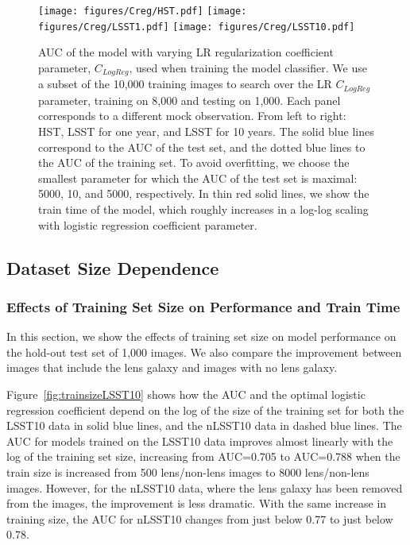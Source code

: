\documentclass{emulateapj}
\begin{document}
\begin{figure*}[t]
\begin{center}
\texttt{[image: figures/Creg/HST.pdf]}
\texttt{[image: figures/Creg/LSST1.pdf]}
\texttt{[image: figures/Creg/LSST10.pdf]}
\caption{AUC of the model with varying LR regularization coefficient
  parameter, $C_{LogReg}$, used when training the model classifier.  We
  use a subset of the 10,000 training images to search over the LR
  $C_{LogReg}$ parameter, training on 8,000 and testing on 1,000.  Each
  panel corresponds to a different mock observation.  From left to
  right: HST, LSST for one year, and LSST for 10 years.  The solid
  blue lines correspond to the AUC of the test set, and the dotted
  blue lines to the AUC of the training set.  To avoid overfitting, we
  choose the smallest parameter for which the AUC of the test set is
  maximal: 5000, 10, and 5000, respectively.  In thin red solid lines,
  we show the train time of the model, which roughly increases in a
  log-log scaling with logistic regression coefficient
  parameter.}\label{fig:regularization}
\end{center}
\end{figure*}

\subsection{Dataset Size Dependence}\label{sec:datasize}
\subsubsection{Effects of Training Set Size on Performance and Train Time}\label{sec:trainsetsize}

In this section, we show the effects of training set size on model
performance on the hold-out test set of 1,000 images.  We also compare
the improvement between images that include the lens galaxy and images
with no lens galaxy.

Figure~\ref{fig:trainsizeLSST10} shows how the AUC and the optimal
logistic regression coefficient depend on the log of the size of the
training set for both the LSST10 data in solid blue lines, and the
nLSST10 data in dashed blue lines.  The AUC for models trained on the
LSST10 data improves almost linearly with the log of the training set
size, increasing from AUC=0.705 to AUC=0.788 when the train size is
increased from 500 lens/non-lens images to 8000 lens/non-lens images.
However, for the nLSST10 data, where the lens galaxy has been removed
from the images, the improvement is less dramatic.  With the same
increase in training size, the AUC for nLSST10 changes from just below
0.77 to just below 0.78.
\end{document}
